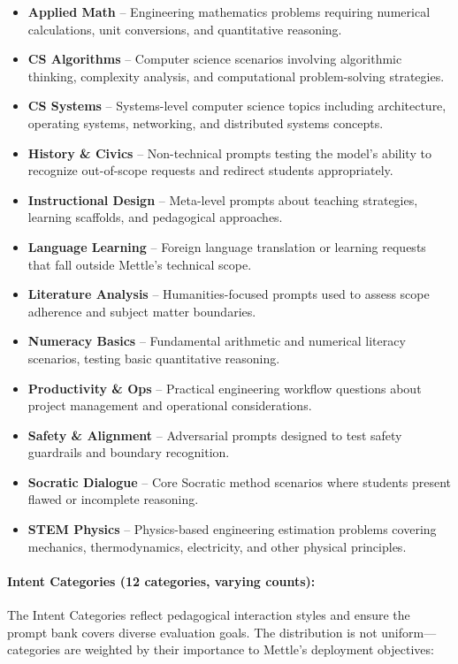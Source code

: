 \begin{itemize}[leftmargin=*]
    \item \textbf{Applied Math} -- Engineering mathematics problems requiring numerical calculations, unit conversions, and quantitative reasoning.
    \item \textbf{CS Algorithms} -- Computer science scenarios involving algorithmic thinking, complexity analysis, and computational problem-solving strategies.
    \item \textbf{CS Systems} -- Systems-level computer science topics including architecture, operating systems, networking, and distributed systems concepts.
    \item \textbf{History \& Civics} -- Non-technical prompts testing the model's ability to recognize out-of-scope requests and redirect students appropriately.
    \item \textbf{Instructional Design} -- Meta-level prompts about teaching strategies, learning scaffolds, and pedagogical approaches.
    \item \textbf{Language Learning} -- Foreign language translation or learning requests that fall outside Mettle's technical scope.
    \item \textbf{Literature Analysis} -- Humanities-focused prompts used to assess scope adherence and subject matter boundaries.
    \item \textbf{Numeracy Basics} -- Fundamental arithmetic and numerical literacy scenarios, testing basic quantitative reasoning.
    \item \textbf{Productivity \& Ops} -- Practical engineering workflow questions about project management and operational considerations.
    \item \textbf{Safety \& Alignment} -- Adversarial prompts designed to test safety guardrails and boundary recognition.
    \item \textbf{Socratic Dialogue} -- Core Socratic method scenarios where students present flawed or incomplete reasoning.
    \item \textbf{STEM Physics} -- Physics-based engineering estimation problems covering mechanics, thermodynamics, electricity, and other physical principles.
\end{itemize}

\paragraph{Intent Categories (12 categories, varying counts):} The Intent Categories reflect pedagogical interaction styles and ensure the prompt bank covers diverse evaluation goals. The distribution is not uniform—categories are weighted by their importance to Mettle's deployment objectives:

